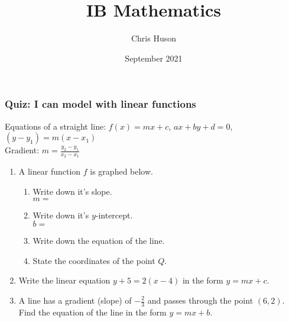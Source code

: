\documentclass[12pt, twoside]{article}
\title{IB Mathematics}
\author{Chris Huson}
\date{September 2021}
\begin{document}
\subsubsection*{Quiz: I can model with linear functions}
Equations of a straight line: $f(x)=mx+c$, $ax+by+d=0$, $(y-y_1)=m(x-x_1)$\\[0.25cm]
Gradient: $\displaystyle m=\frac{y_2-y_1}{x_2-x_1}$ \vspace{1cm}
\begin{enumerate}
\item A linear function $f$ is graphed below.
\begin{multicols}{2}
\begin{enumerate}
  \item Write down it's slope.\\ $m=$
  \vspace{0.25cm}
  \item Write down it's $y$-intercept.\\ $b=$
  \vspace{0.25cm}
  \item Write down the equation of the line.
  \vspace{1cm}
  \item State the coordinates of the point $Q$.
\end{enumerate} \vspace{.5cm}
  \begin{center} 
  \end{center}
\end{multicols}

\item Write the linear equation $y+5=2(x-4)$ in the form $y=mx+c$. \vspace{4cm}

\item A line has a gradient (slope) of $\displaystyle -\frac{2}{3}$ and passes through the point $(6, 2)$. Find the equation of the line in the form $y=mx+b$.


\end{enumerate}
\end{document}
